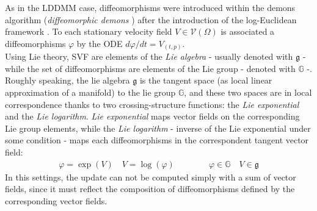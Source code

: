 As in the LDDMM case, diffeomorphisms were introduced within the demons algorithm (\emph{diffeomorphic demons} \cite{vercauteren2006robust}) after the introduction of the log-Euclidean framework \cite{Arsigny:MRM:06}. 
To each stationary velocity field $V \in \mathcal{V}(\Omega)$ is associated a diffeomorphisms $\varphi$ by the ODE $d\varphi /dt = V_{(t,p)} $.\\
Using Lie theory, SVF are elements of the \emph{Lie algebra} - usually denoted with $\mathfrak{g}$ - while the set of diffeomorphisms are elements of the Lie group - denoted with $\mathbb{G}$ -.\\
Roughly speaking, the lie algebra $\mathfrak{g}$ is the tangent space (as local linear approximation of a manifold) to the lie group $\mathbb{G}$, and these two spaces are in local correspondence thanks to two crossing-structure functions: the \emph{Lie exponential} and the \emph{Lie logarithm}. \emph{Lie exponential} maps vector fields on the corresponding Lie group elements, while the \emph{Lie logarithm} - inverse of the Lie exponential under some condition \cite{lee2012introduction}- maps each diffeomorphisms in the correspondent tangent vector field:
\begin{align*}
\varphi = \exp(V)  
\quad
V = \log(\varphi ) 
\qquad \qquad
\varphi  \in \mathbb{G}
\quad
V \in \mathfrak{g}
\end{align*}
In this settings, the update can not be computed simply with a sum of vector fields, since it must reflect the composition of diffeomorphisms defined by the corresponding vector fields.\\


